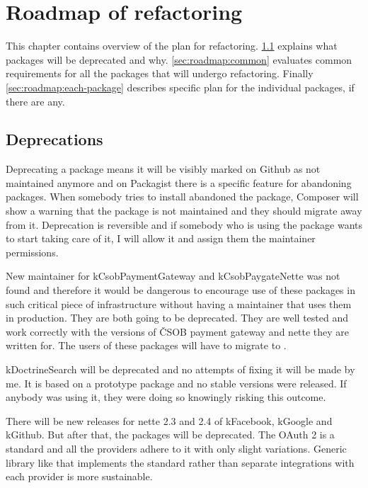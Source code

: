 \chapter{Roadmap of refactoring}

This chapter contains overview of the plan for refactoring. \ref{sec:roadmap:deprecations} explains what packages will be deprecated and why. \ref{sec:roadmap:common} evaluates common requirements for all the packages that will undergo refactoring. Finally \ref{sec:roadmap:each-package} describes specific plan for the individual packages, if there are any.

\section{Deprecations} \label{sec:roadmap:deprecations}

Deprecating a package means it will be visibly marked on Github as not maintained anymore and on Packagist there is a specific feature for abandoning packages. When somebody tries to install abandoned the package, Composer will show a warning that the package is not maintained and they should migrate away from it. Deprecation is reversible and if somebody who is using the package wants to start taking care of it, I will allow it and assign them the maintainer permissions.

New maintainer for \gls{kCsobPaymentGateway} and \gls{kCsobPaygateNette} was not found and therefore it would be dangerous to encourage use of these packages in such critical piece of infrastructure without having a maintainer that uses them in production. They are both going to be deprecated. They are well tested and work correctly with the versions of ČSOB payment gateway and \gls{nette} they are written for. The users of these packages will have to migrate to .

\gls{kDoctrineSearch} will be deprecated and no attempts of fixing it will be made by me. It is based on a prototype package and no stable versions were released. If anybody was using it, they were doing so knowingly risking this outcome.

There will be new releases for \gls{nette} 2.3 and 2.4 of \gls{kFacebook}, \gls{kGoogle} and \gls{kGithub}. But after that, the packages will be deprecated. The OAuth 2 is a standard and all the providers adhere to it with only slight variations. Generic library like  that implements the standard rather than separate integrations with each provider is more sustainable.

